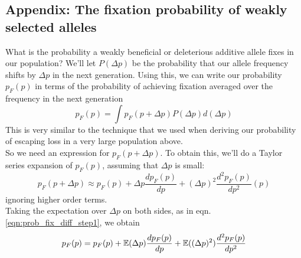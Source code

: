 {\subsection{Appendix: The fixation probability of
 weakly selected alleles}
\label{Section:fixation_weakly_sel}

What is the probability a weakly beneficial or deleterious additive allele fixes in our population?  We'll let $P(\Delta p)$ be the probability that our allele frequency
shifts by $\Delta p$ in the next generation. Using this, we can write our probability $p_F(p)$ in terms of the probability of
achieving fixation averaged over the frequency in the next generation
\begin{equation}
p_F(p)  = \int p_F(p+\Delta p) P(\Delta p) d(\Delta p) \label{eqn:prob_fix_diff_step1}
\end{equation}
This is very similar to the technique that we used when deriving our
probability of escaping loss in a very large population above. \\

So we need an expression for $p_F(p+\Delta p)$. To obtain this, we'll
do a Taylor series expansion of $p_F(p)$, assuming that $\Delta p $ is small:
\begin{equation}
p_F(p+\Delta p) \approx p_F(p) + \Delta p \frac{dp_F(p)}{dp} + (\Delta p)^2
\frac{d^2p_F(p)}{dp^2} (p)
\end{equation}
ignoring higher order terms.\\

Taking the expectation over $\Delta p $ on both sides, as in
eqn. \ref{eqn:prob_fix_diff_step1}, we obtain
\begin{equation}
p_F(p) = p_F(p) + \mathbb{E}(\Delta p) \frac{dp_F (p)}{dp} + \mathbb{E}((\Delta p)^2)
\frac{d^2p_F(p)}{dp^2}
\end{equation}

}
